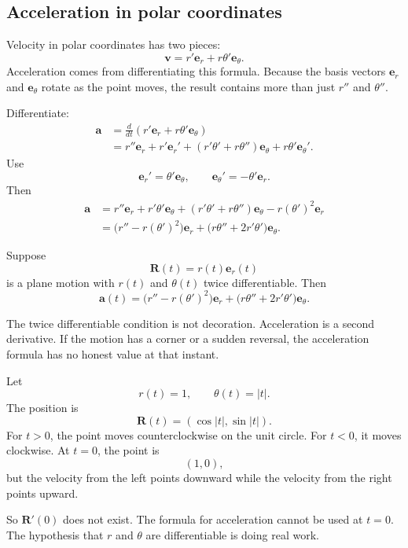 \subsection{Acceleration in polar coordinates}

Velocity in polar coordinates has two pieces:
\[
    \mathbf v=r'\mathbf e_r+r\theta'\mathbf e_\theta.
\]
Acceleration comes from differentiating this formula.  Because the basis vectors
\(\mathbf e_r\) and \(\mathbf e_\theta\) rotate as the point moves, the result contains
more than just \(r''\) and \(\theta''\).

Differentiate:
\[
\begin{aligned}
    \mathbf a
    &=
    \frac{d}{dt}\left(r'\mathbf e_r+r\theta'\mathbf e_\theta\right)\\
    &=
    r''\mathbf e_r+r'\mathbf e_r'
    +(r'\theta'+r\theta'')\mathbf e_\theta
    +r\theta'\mathbf e_\theta'.
\end{aligned}
\]
Use
\[
    \mathbf e_r'=\theta'\mathbf e_\theta,
    \qquad
    \mathbf e_\theta'=-\theta'\mathbf e_r.
\]
Then
\[
\begin{aligned}
    \mathbf a
    &=
    r''\mathbf e_r
    +r'\theta'\mathbf e_\theta
    +(r'\theta'+r\theta'')\mathbf e_\theta
    -r(\theta')^2\mathbf e_r\\
    &=
    \bigl(r''-r(\theta')^2\bigr)\mathbf e_r
    +
    \bigl(r\theta''+2r'\theta'\bigr)\mathbf e_\theta.
\end{aligned}
\]

\begin{theorem}
Suppose
\[
    \mathbf R(t)=r(t)\mathbf e_r(t)
\]
is a plane motion with \(r(t)\) and \(\theta(t)\) twice differentiable.  Then
\[
\boxed{
    \mathbf a(t)
    =
    \bigl(r''-r(\theta')^2\bigr)\mathbf e_r
    +
    \bigl(r\theta''+2r'\theta'\bigr)\mathbf e_\theta.
}
\]
\end{theorem}

The twice differentiable condition is not decoration.  Acceleration is a second
derivative.  If the motion has a corner or a sudden reversal, the acceleration formula
has no honest value at that instant.

\begin{example}
Let
\[
    r(t)=1,
    \qquad
    \theta(t)=|t|.
\]
The position is
\[
    \mathbf R(t)=(\cos|t|,\sin|t|).
\]
For \(t>0\), the point moves counterclockwise on the unit circle.  For \(t<0\), it moves
clockwise.  At \(t=0\), the point is
\[
    (1,0),
\]
but the velocity from the left points downward while the velocity from the right points
upward.

So \(\mathbf R'(0)\) does not exist.  The formula for acceleration cannot be used at
\(t=0\).  The hypothesis that \(r\) and \(\theta\) are differentiable is doing real work.
\end{example}

